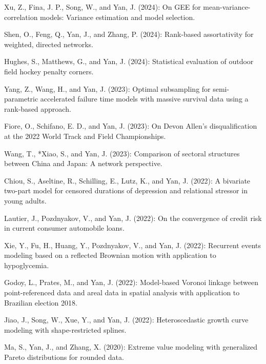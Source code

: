 \documentclass[Statistics]{vita}
\begin{document}
\begin{vita}
\begin{Publications}
\begin{UnderReview}
  \item *Xu, Z., Fina, J. P., Song, W., and Yan, J. (2024): On GEE for mean-variance-correlation models: Variance estimation and model selection.
  \item Shen, O., Feng, Q., Yan, J., and Zhang, P. (2024): Rank-based assortativity for weighted, directed networks.
  \item *Hughes, S., Matthews, G., and Yan, J. (2024): Statistical evaluation of outdoor field hockey penalty corners.
  \item *Yang, Z., Wang, H., and Yan, J. (2023): Optimal subsampling for semi-parametric accelerated failure time models with massive survival data using a rank-based approach.
  \item *Fiore, O., Schifano, E. D., and Yan, J. (2023): On Devon Allen’s disqualification at the 2022 World Track and Field Championships.
  \item *Wang, T., *Xiao, S., and Yan, J. (2023): Comparison of sectoral structures between China and Japan: A network perspective.
  \item Chiou, S., Aseltine, R., Schilling, E., Lutz, K., and Yan, J. (2022): A bivariate two-part model for censored durations of depression and relational stressor in young adults.
  \item *Lautier, J., Pozdnyakov, V., and Yan, J. (2022): On the convergence of credit risk in current consumer automobile loans.
  \item *Xie, Y., Fu, H., Huang, Y., Pozdnyakov, V., and Yan, J. (2022): Recurrent events modeling based on a reflected Brownian motion with application to hypoglycemia.
  \item *Godoy, L., Prates, M., and Yan, J. (2022): Model-based Voronoi linkage between point-referenced data and areal data in spatial analysis with application to Brazilian election 2018.
  \item *Jiao, J., Song, W., Xue, Y., and Yan, J. (2022): Heteroscedastic growth curve modeling with shape-restricted splines.
  \item *Ma, S., Yan, J., and Zhang, X. (2020): Extreme value modeling with generalized Pareto distributions for rounded data.

\end{UnderReview}
\end{Publications}
\end{vita}
\end{document}
